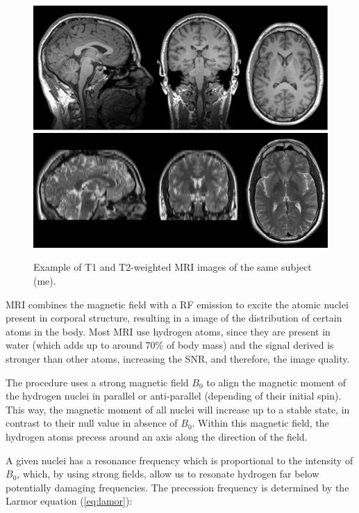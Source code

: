 \begin{figure}[htp]
	\centering
	\includegraphics[width=0.7\linewidth]{Graphics/ch2/example_MRIT1}\\
	\includegraphics[width=0.7\linewidth]{Graphics/ch2/example_MRIT2}
	\caption[Example of T1 and T2-weighted MRI images.]{Example of T1 and T2-weighted MRI images of the same subject (me).}
	\label{fig:example_MRI}
\end{figure}

\ac{MRI} combines the magnetic field with a \ac{RF} emission to excite the atomic nuclei present in corporal structure, resulting in a image of the distribution of certain atoms in the body. Most \ac{MRI} use hydrogen atoms, since they are present in water (which adds up to around 70\% of body mass) and the signal derived is stronger than other atoms, increasing the \ac{SNR}, and therefore, the image quality. 

The procedure uses a strong magnetic field $B_0$ to align the magnetic moment of the hydrogen nuclei in parallel or anti-parallel (depending of their initial spin). This way, the magnetic moment of all nuclei will increase up to a stable state, in contrast to their null value in absence of $B_0$. Within this magnetic field, the hydrogen atoms precess around an axis along the direction of the field. 

A given nuclei has a resonance frequency which is proportional to the intensity of $B_0$, which, by using strong fields, allow us to resonate hydrogen far below potentially damaging frequencies. The precession frequency is determined by the Larmor equation (\ref{eq:lamor}):

